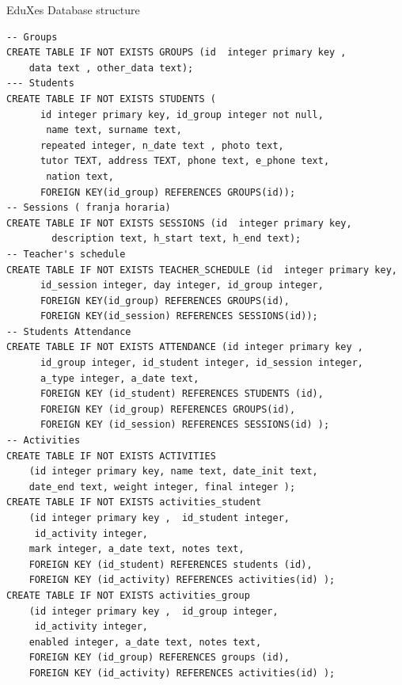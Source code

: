 \begin{bclogo}[couleur=green!30,arrondi=0.1, logo=\bcpanchant,  ombre=true ] 
{EduXes Database structure \label{DatabaseSchema}}   
\begin{verbatim}
-- Groups
CREATE TABLE IF NOT EXISTS GROUPS (id  integer primary key ,
    data text , other_data text);
--- Students
CREATE TABLE IF NOT EXISTS STUDENTS (
      id integer primary key, id_group integer not null,
       name text, surname text,
      repeated integer, n_date text , photo text,
      tutor TEXT, address TEXT, phone text, e_phone text,
       nation text,
      FOREIGN KEY(id_group) REFERENCES GROUPS(id));
-- Sessions ( franja horaria)
CREATE TABLE IF NOT EXISTS SESSIONS (id  integer primary key,
        description text, h_start text, h_end text);
-- Teacher's schedule
CREATE TABLE IF NOT EXISTS TEACHER_SCHEDULE (id  integer primary key,
      id_session integer, day integer, id_group integer,
      FOREIGN KEY(id_group) REFERENCES GROUPS(id),
      FOREIGN KEY(id_session) REFERENCES SESSIONS(id));
-- Students Attendance
CREATE TABLE IF NOT EXISTS ATTENDANCE (id integer primary key ,
      id_group integer, id_student integer, id_session integer,
      a_type integer, a_date text,
      FOREIGN KEY (id_student) REFERENCES STUDENTS (id),
      FOREIGN KEY (id_group) REFERENCES GROUPS(id),
      FOREIGN KEY (id_session) REFERENCES SESSIONS(id) );
-- Activities
CREATE TABLE IF NOT EXISTS ACTIVITIES
    (id integer primary key, name text, date_init text, 
    date_end text, weight integer, final integer );
CREATE TABLE IF NOT EXISTS activities_student
    (id integer primary key ,  id_student integer,
     id_activity integer,
    mark integer, a_date text, notes text,
    FOREIGN KEY (id_student) REFERENCES students (id),
    FOREIGN KEY (id_activity) REFERENCES activities(id) );
CREATE TABLE IF NOT EXISTS activities_group
    (id integer primary key ,  id_group integer,
     id_activity integer,
    enabled integer, a_date text, notes text,
    FOREIGN KEY (id_group) REFERENCES groups (id),
    FOREIGN KEY (id_activity) REFERENCES activities(id) );
\end{verbatim}
\end{bclogo}
